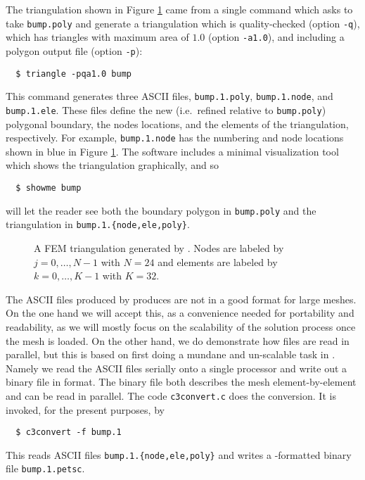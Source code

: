 The triangulation shown in Figure \ref{fig:triangulation} came from a single command which asks \Triangle to take \texttt{bump.poly} and generate a triangulation which is quality-checked \citep{Shewchuk1996} (option \texttt{-q}), which has triangles with maximum area of $1.0$ (option \texttt{-a1.0}), and including a polygon output file (option \texttt{-p}):
\begin{verbatim}
  $ triangle -pqa1.0 bump
\end{verbatim}
This command generates three ASCII files, \texttt{bump.1.poly}, \texttt{bump.1.node}, and  \texttt{bump.1.ele}.  These files define the new (i.e.~refined relative to \texttt{bump.poly}) polygonal boundary, the nodes locations, and the elements of the triangulation, respectively.  For example, \texttt{bump.1.node} has the numbering and node locations shown in blue in Figure \ref{fig:triangulation}.  The \Triangle software includes a minimal visualization tool which shows the triangulation graphically, and so
\begin{verbatim}
  $ showme bump
\end{verbatim}
will let the reader see both the boundary polygon in \texttt{bump.poly} and the triangulation in \texttt{bump.1.\{node,ele,poly\}}.

\begin{figure}
\bigskip

\caption{A FEM triangulation generated by \Triangle.  {\color{blue} Nodes} are labeled by $j=0,\dots,N-1$ with $N=24$ and {\color{red} elements} are labeled by $k=0,\dots,K-1$ with $K=32$.}
\label{fig:triangulation}
\end{figure}

The ASCII files produced by \Triangle produces are not in a good format for large meshes.  On the one hand we will accept this, as a convenience needed for portability and readability, as we will mostly focus on the scalability of the solution process once the mesh is loaded.  On the other hand, we do demonstrate how files are read in parallel, but this is based on first doing a mundane and un-scalable task in \PETSc.  Namely we read the ASCII \Triangle files serially onto a single processor and write out a binary file in \PETSc format.  The binary file both describes the mesh element-by-element and can be read in parallel.  The code \texttt{c3convert.c} does the conversion.  It is invoked, for the present purposes, by
\begin{verbatim}
  $ c3convert -f bump.1
\end{verbatim}
This reads ASCII files \texttt{bump.1.\{node,ele,poly\}} and writes a \PETSc-formatted binary file \texttt{bump.1.petsc}.

